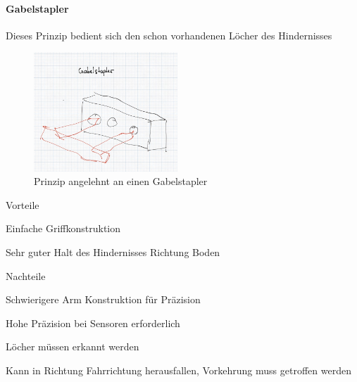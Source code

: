 \paragraph{Gabelstapler}
Dieses Prinzip bedient sich den schon vorhandenen Löcher des Hindernisses 
\begin{figure}[h!]
        \centering
        \includegraphics[width=0.48\textwidth]{img/technologierecherche/Aufnahme/Gabelstapler.jpg}
        \caption{Prinzip angelehnt an einen Gabelstapler}
        \label{img:tech_Gaplerstapler}
\end{figure}

\begin{minipage}[t]{0.48\textwidth}
    \begin{items}
          \item [Vorteile]
          \item Einfache Griffkonstruktion
          \item Sehr guter Halt des Hindernisses Richtung Boden
    \end{items}
\end{minipage}
\hfill
\begin{minipage}[t]{0.48\textwidth}
    \begin{items}
          \item [Nachteile]
          \item Schwierigere Arm Konstruktion für Präzision
          \item Hohe Präzision bei Sensoren erforderlich
          \item Löcher müssen erkannt werden
          \item Kann in Richtung Fahrrichtung herausfallen, Vorkehrung muss getroffen werden
    \end{items}
\end{minipage}
